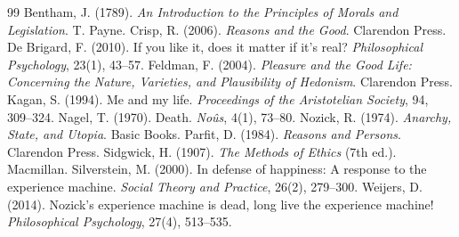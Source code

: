 \documentclass{situationist-preprint}
\begin{document}
\begin{thebibliography}{99}\small
{} Bentham, J. (1789). \emph{An Introduction to the Principles of Morals and Legislation}. T. Payne.
 Crisp, R. (2006). \emph{Reasons and the Good}. Clarendon Press.
 De Brigard, F. (2010). If you like it, does it matter if it's real? \emph{Philosophical Psychology}, 23(1), 43--57.
 Feldman, F. (2004). \emph{Pleasure and the Good Life: Concerning the Nature, Varieties, and Plausibility of Hedonism}. Clarendon Press.
 Kagan, S. (1994). Me and my life. \emph{Proceedings of the Aristotelian Society}, 94, 309--324.
 Nagel, T. (1970). Death. \emph{No\^us}, 4(1), 73--80.
 Nozick, R. (1974). \emph{Anarchy, State, and Utopia}. Basic Books.
 Parfit, D. (1984). \emph{Reasons and Persons}. Clarendon Press.
 Sidgwick, H. (1907). \emph{The Methods of Ethics} (7th ed.). Macmillan.
 Silverstein, M. (2000). In defense of happiness: A response to the experience machine. \emph{Social Theory and Practice}, 26(2), 279--300.
 Weijers, D. (2014). Nozick's experience machine is dead, long live the experience machine! \emph{Philosophical Psychology}, 27(4), 513--535.
\end{thebibliography}
\end{document}
